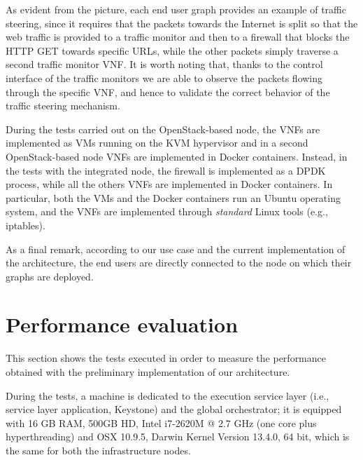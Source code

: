 As evident from the picture, each end user graph provides an example of traffic steering, since it requires that the packets towards the Internet is split so that the web traffic is provided to a traffic monitor and then to a firewall that blocks the HTTP GET towards specific URLs, while the other packets simply traverse a second traffic monitor VNF.
It is worth noting that, thanks to the control interface of the traffic monitors we are able to observe the packets flowing through the specific VNF, and hence to validate the correct behavior of the traffic steering mechanism.

During the tests carried out on the OpenStack-based node, the VNFs are implemented as VMs running on the KVM hypervisor and in a second OpenStack-based node VNFs are implemented in Docker containers.
Instead, in the tests with the integrated node, the firewall is implemented as a DPDK process, while all the others VNFs are implemented in Docker containers.
In particular, both the VMs and the Docker containers run an Ubuntu operating system, and the VNFs are implemented through \textit{standard} Linux tools (e.g., iptables).


As a final remark, according to our use case and the current implementation of the architecture, the end users are directly connected to the node on which their graphs are deployed. %

\section{Performance evaluation}
This section shows the tests executed in order to measure the performance obtained with the preliminary implementation of our architecture.

During the tests, a machine is dedicated to the execution service layer (i.e., service layer application, Keystone) and the global orchestrator; it is equipped with 16 GB RAM, 500GB HD, Intel i7-2620M @ 2.7 GHz (one core plus hyperthreading) and OSX 10.9.5, Darwin Kernel Version 13.4.0, 64 bit, which is the same for both the infrastructure nodes.

